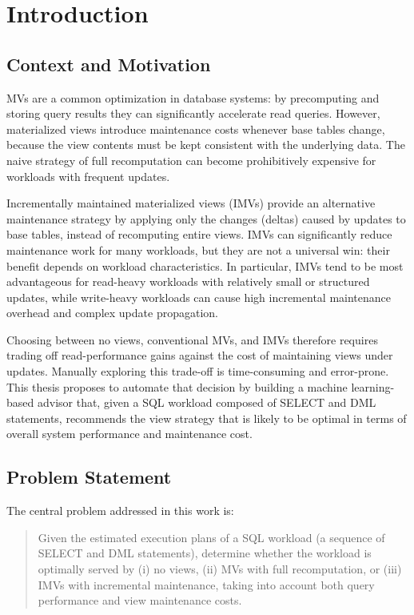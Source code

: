 \chapter{Introduction}
\label{chap:introduction}

\section{Context and Motivation}
\label{sec:context}
\ac{MV}s are a common optimization in database systems: by precomputing and storing query results they can significantly accelerate read queries. However, materialized views introduce maintenance costs whenever base tables change, because the view contents must be kept consistent with the underlying data. The naive strategy of full recomputation can become prohibitively expensive for workloads with frequent updates.

Incrementally maintained materialized views (\ac{IMV}s) provide an alternative maintenance strategy by applying only the changes (deltas) caused by updates to base tables, instead of recomputing entire views. \ac{IMV}s can significantly reduce maintenance work for many workloads, but they are not a universal win: their benefit depends on workload characteristics. In particular, \ac{IMV}s tend to be most advantageous for read-heavy workloads with relatively small or structured updates, while write-heavy workloads can cause high incremental maintenance overhead and complex update propagation.

Choosing between no views, conventional \ac{MV}s, and \ac{IMV}s therefore requires trading off read-performance gains against the cost of maintaining views under updates. Manually exploring this trade-off is time-consuming and error-prone. This thesis proposes to automate that decision by building a machine learning-based advisor that, given a SQL workload composed of SELECT and \ac{DML} statements, recommends the view strategy that is likely to be optimal in terms of overall system performance and maintenance cost.

\section{Problem Statement}
\label{sec:problemStatment}
The central problem addressed in this work is:

\begin{quote}
Given the estimated execution plans of a SQL workload (a sequence of SELECT and \ac{DML} statements), determine whether the workload is optimally served by (i) no views, (ii) \ac{MV}s with full recomputation, or (iii) \ac{IMV}s with incremental maintenance, taking into account both query performance and view maintenance costs.
\end{quote}

